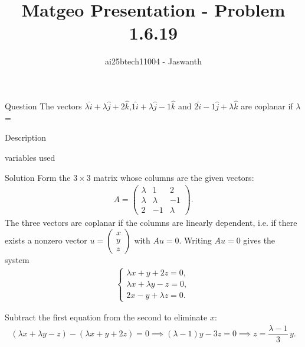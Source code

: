 \documentclass{beamer}
\title{Matgeo Presentation - Problem 1.6.19}
\author{ai25btech11004 - Jaswanth}
\numberwithin{equation}{section}
\theoremstyle{remark}
\newcommand{\myvec}[1]{\ensuremath{\begin{pmatrix}#1\end{pmatrix}}}
\begin{document}
\frame{\titlepage}
\begin{frame}{Question}
The vectors $\lambda\hat{i}+\lambda\hat{j}+2\hat{k}$,$1\hat{i}+\lambda\hat{j}-1\hat{k}$ and $2\hat{i}-1\hat{j}+\lambda\hat{k}$ are coplanar if $\lambda$ = \\
\end{frame}

\begin{frame}{Description}
    \begin{table}[h!]
	\centering
	
	\caption{variables used}
	\label{}
\end{table}
\end{frame}

\begin{frame}{Solution}
    Form the \(3\times3\) matrix whose columns are the given vectors:
\begin{align*}
A=\myvec{\lambda & 1 & 2\\
\lambda & \lambda & -1\\
2 & -1 & \lambda}.
\end{align*}
The three vectors are coplanar if the columns are linearly dependent, i.e. if there exists a nonzero vector
\(u=\myvec{x\\y\\z} \) with \(A u=0\).  Writing \(Au=0\) gives the system
\begin{align*}
\begin{cases}
\lambda x + y + 2z = 0,\\[4pt]
\lambda x + \lambda y - z = 0,\\[4pt]
2x - y + \lambda z = 0.
\end{cases}
\end{align*}

Subtract the first equation from the second to eliminate \(x\):
\begin{align*}
(\lambda x+\lambda y - z) - (\lambda x + y + 2z)=0
\implies (\lambda-1)y -3z =0
\implies z=\dfrac{\lambda-1}{3}\,y.
\end{align*}
\end{frame}
\end{document}
